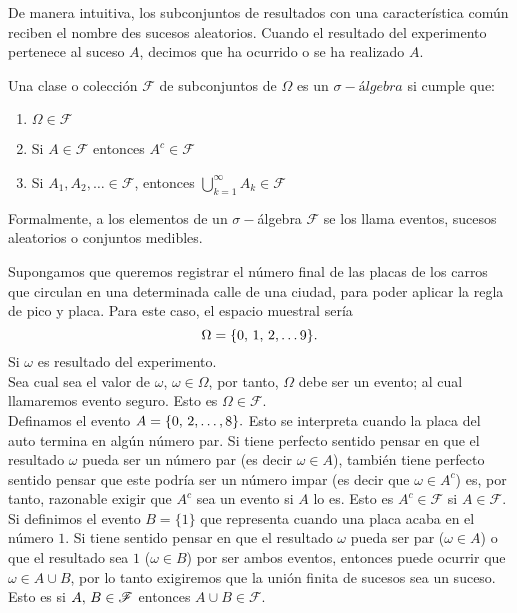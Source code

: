 De manera intuitiva, los subconjuntos de resultados con una característica común reciben el nombre des sucesos aleatorios. Cuando el resultado del experimento pertenece al suceso $A$, decimos que ha ocurrido o se ha realizado $A$.
\begin{Def}
    Una clase o colección $\mathscr{F}$ de subconjuntos de $\Omega$ es un $\sigma- \textit{álgebra}$ si cumple que:
    \begin{enumerate}
        \item $\Omega\in\mathscr{F}$
        \item Si $A\in\mathscr{F}$ entonces $A^c\in\mathscr{F}$
        \item Si $A_1, A_2,\ldots\in\mathscr{F}$, entonces  $\bigcup_{k=1}^\infty A_k\in\mathscr{F}$
    \end{enumerate}
\end{Def}
 Formalmente, a los elementos de un $\sigma-$álgebra $\mathscr{F}$ se los llama eventos, sucesos aleatorios o conjuntos medibles.
\begin{Ejm}
    Supongamos que queremos registrar el número final de las placas de los carros que circulan en una determinada calle de una ciudad, para poder aplicar la regla de pico y placa. Para este caso, el espacio muestral sería 
    $$\Omega=\{0,\thinspace 1,\thinspace 2,\ldots 9\}.$$
    Si $\omega$ es resultado del experimento.\\
    Sea cual sea el valor de $\omega$, $\omega \in\Omega$, por tanto, $\Omega$ debe ser un evento; al cual llamaremos evento seguro. Esto es $\Omega\in\mathscr{F}.$\\ Definamos el evento $A=\{0,\thinspace 2,\ldots ,8\}.$ Esto se interpreta cuando la placa del auto termina en algún número par. Si tiene perfecto sentido pensar en que el resultado $\omega$ pueda ser un número par (es decir $\omega\in A$), también tiene perfecto sentido pensar que este podría ser un número impar (es decir que $\omega \in A^c$) es, por tanto, razonable exigir que $A^c$ sea un evento si $A$ lo es. Esto es $A^c\in\mathscr{F}$ si $A\in\mathscr{F}.$\\Si definimos el evento $B=\{1\}$ que representa cuando una placa acaba en el número $1$. Si tiene sentido pensar en que el resultado $\omega$ pueda ser par ($\omega\in A$) o que el resultado sea $1$ ($\omega\in B$) por ser ambos eventos, entonces puede ocurrir que $\omega\in A\cup B$, por lo tanto exigiremos que la unión finita de sucesos sea un suceso. Esto es si $A,\thinspace B\in\mathscr{F}$ entonces $A\cup B\in \mathscr{F}.$
\end{Ejm}
